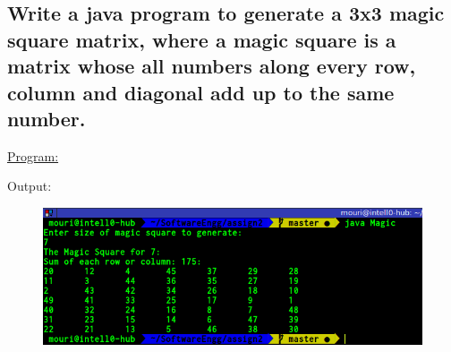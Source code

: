\documentclass[a4paper,11pt]{article}
\begin{document}
\bigskip

\subsection{Write a java program to generate a 3x3 magic square matrix, where a magic square is a matrix whose all numbers along every row, column and diagonal add up to the same number.}
\underline{Program:}

Output:
\begin{figure}[H]
\centering
\includegraphics[width=350pt,height=\textheight,keepaspectratio]{./pics/Java/6.png}
\end{figure}

\bigskip
\end{document}
